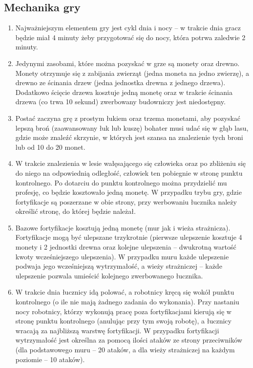 \documentclass[12pt, a4paper]{article}
\begin{document}
\subsection{Mechanika gry}
\begin{enumerate}
\item Najważniejszym elementem gry jest cykl dnia i nocy -- w trakcie dnia gracz będzie miał 4 minuty żeby przygotować się do nocy, która potrwa zaledwie 2 minuty.
\item Jedynymi zasobami, które można pozyskać w grze są monety oraz drewno. Monety otrzymuje się z zabijania zwierząt (jedna moneta na jedno zwierzę), a drewno ze ścinania drzew (jedna jednostka drewna z jednego drzewa). Dodatkowo ścięcie drzewa kosztuje jedną monetę oraz w trakcie ścinania drzewa (co trwa 10 sekund) zwerbowany budowniczy jest niedostępny.
\item Postać zaczyna grę z prostym łukiem oraz trzema monetami, aby pozyskać lepszą broń (zaawansowany łuk lub kuszę) bohater musi udać się w głąb lasu, gdzie może znaleźć skrzynie, w których jest szansa na znalezienie tych broni lub od 10 do 20 monet.
\item W trakcie znalezienia w lesie wałęsającego się człowieka oraz po zbliżeniu się do niego na odpowiednią odległość, człowiek ten pobiegnie w stronę punktu kontrolnego. Po dotarciu do punktu kontrolnego można przydzielić mu profesję, co będzie kosztowało jedną monetę. W przypadku trybu gry, gdzie fortyfikacje są poszerzane w obie strony, przy werbowaniu łucznika należy określić stronę, do której będzie należał.
\item Bazowe fortyfikacje kosztują jedną monetę (mur jak i wieża strażnicza). Fortyfikacje mogą być ulepszane trzykrotnie (pierwsze ulepszenie kosztuje 4 monety i 2 jednostki drewna oraz kolejne ulepszenia -- dwukrotną wartość kwoty wcześniejszego ulepszenia). W przypadku muru każde ulepszenie podwaja jego wcześniejszą wytrzymałość, a wieży strażniczej -- każde ulepszenie pozwala umieścić kolejnego zwerbowanego łucznika.
\item W trakcie dnia łucznicy idą polować, a robotnicy kręcą się wokół punktu kontrolnego (o ile nie mają żadnego zadania do wykonania). Przy nastaniu nocy robotnicy, którzy wykonują pracę poza fortyfikacjami kierują się w stronę punktu kontrolnego (anulując przy tym swoją robotę), a łucznicy wracają za najbliższą warstwę fortyfikacji. W przypadku fortyfikacji wytrzymałość jest określna za pomocą ilości ataków ze strony przeciwników (dla podstawowego muru -- 20 ataków, a dla wieży strażniczej na każdym poziomie -- 10 ataków).

\end{enumerate}
\end{document}
